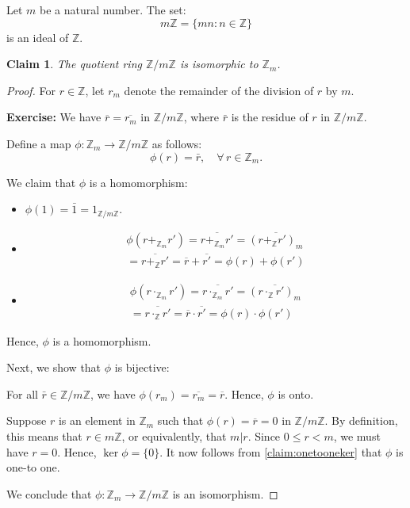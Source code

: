 \documentclass[a4paper,12pt]{report}
\newcommand{\ol}[1]{\overline{#1}}
\newcommand{\ZZ}{\mathbb{Z}}
\newcommand{\ra}{\longrightarrow}
\newcounter{statement}
\numberwithin{statement}{chapter}
\newtheorem{claim}[statement]{Claim}
\numberwithin{equation}{chapter}
\numberwithin{section}{chapter}
\numberwithin{subsection}{section}
\begin{document}
Let $m$ be a natural number.  The set:
\[
m\mathbb{Z} = \{mn : n \in \mathbb{Z}\}
\]
is an ideal of $\mathbb{Z}$.
\begin{claim}

The quotient ring $\mathbb{Z}/m\mathbb{Z}$ is isomorphic to $\mathbb{Z}_m$.

\end{claim}
\begin{proof}

For $r \in \mathbb{Z}$, let $r_m$ denote the remainder of the division of $r$ by $m$.





 {\bf Exercise:}  We have $\ol{r} = \ol{r_m}$ in $\ZZ/m\ZZ$,
where $\bar{r}$ is the residue of $r$ in $\ZZ/m\ZZ$.





Define a map $\phi : \mathbb{Z}_m \ra \ZZ/m\ZZ$ as follows:
\[
\phi(r) = \bar{r},\quad \forall\, r \in \ZZ_m.
\]

We claim that $\phi$ is a homomorphism:
\begin{itemize}
\item 
$\phi(1) = \bar{1} = 1_{\ZZ/m\ZZ}$.

\item 
\begin{multline*}
\phi(r +_{\ZZ_m} r') = \ol{r +_{\ZZ_m} r'} = \ol{(r +_{\ZZ} r')_m} \\
= \ol{r +_{\ZZ} r'} = \ol{r} + \ol{r'} = \phi(r) + \phi(r')
\end{multline*}

\item 
\begin{multline*}
\phi(r \cdot_{\ZZ_m} r') = \ol{r \cdot_{\ZZ_m} r'} = \ol{(r \cdot_{\ZZ} r')_m}\\
= \ol{r \cdot_{\ZZ} r'} = \ol{r} \cdot \ol{r'} = \phi(r) \cdot \phi(r')
\end{multline*}
\end{itemize}

Hence, $\phi$ is a homomorphism.




Next, we show that $\phi$ is bijective:


For all $\bar{r} \in \ZZ/m\ZZ$, we have $\phi(r_m) = \ol{r_m} = \ol{r}$.
Hence, $\phi$ is onto.





Suppose $r$ is an element in $\ZZ_m$
such that $\phi(r) = \ol{r} = 0$ in $\ZZ/m\ZZ$.  By definition, this means that $r \in m\ZZ$,
or equivalently, that $m | r$.  Since $0 \leq r < m$, we must have $r = 0$.
Hence, $\ker \phi = \{0\}$.
It now follows from \cref{claim:onetooneker} that $\phi$ is one-to one.


We conclude that $\phi : \ZZ_m \ra \ZZ/m\ZZ$ is an isomorphism.


\end{proof}
\end{document}
